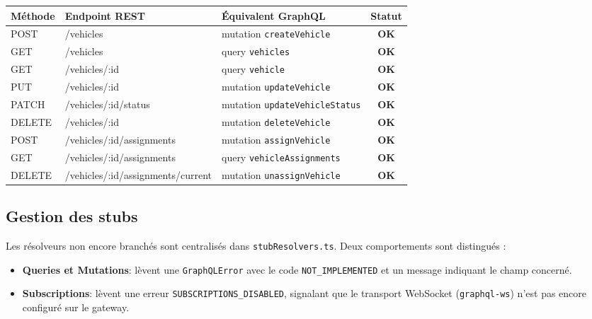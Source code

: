 \documentclass[12pt,a4paper]{article}
\begin{document}
\begin{center}
\begin{tabular}{|l|l|l|c|}
  \hline
  \textbf{Méthode} & \textbf{Endpoint REST} & \textbf{Équivalent GraphQL} & \textbf{Statut} \\
  \hline
  POST   & /vehicles                     & mutation \texttt{createVehicle}       & \textcolor{green!60!black}{\textbf{OK}} \\
  GET    & /vehicles                     & query \texttt{vehicles}               & \textcolor{green!60!black}{\textbf{OK}} \\
  GET    & /vehicles/:id                 & query \texttt{vehicle}                & \textcolor{green!60!black}{\textbf{OK}} \\
  PUT    & /vehicles/:id                 & mutation \texttt{updateVehicle}       & \textcolor{green!60!black}{\textbf{OK}} \\
  PATCH  & /vehicles/:id/status          & mutation \texttt{updateVehicleStatus} & \textcolor{green!60!black}{\textbf{OK}} \\
  DELETE & /vehicles/:id                 & mutation \texttt{deleteVehicle}       & \textcolor{green!60!black}{\textbf{OK}} \\
  POST   & /vehicles/:id/assignments     & mutation \texttt{assignVehicle}       & \textcolor{green!60!black}{\textbf{OK}} \\
  GET    & /vehicles/:id/assignments     & query \texttt{vehicleAssignments}     & \textcolor{green!60!black}{\textbf{OK}} \\
  DELETE & /vehicles/:id/assignments/current & mutation \texttt{unassignVehicle} & \textcolor{green!60!black}{\textbf{OK}} \\
  \hline
\end{tabular}
\end{center}

\subsection{Gestion des stubs}

Les résolveurs non encore branchés sont centralisés dans \texttt{stubResolvers.ts}.
Deux comportements sont distingués :

\begin{itemize}
  \item \textbf{Queries et Mutations}: lèvent une \texttt{GraphQLError} avec le
        code \texttt{NOT\_IMPLEMENTED} et un message indiquant le champ concerné.
  \item \textbf{Subscriptions}: lèvent une erreur \texttt{SUBSCRIPTIONS\_DISABLED},
        signalant que le transport WebSocket (\texttt{graphql-ws}) n'est pas encore
        configuré sur le gateway.
\end{itemize}
\end{document}
